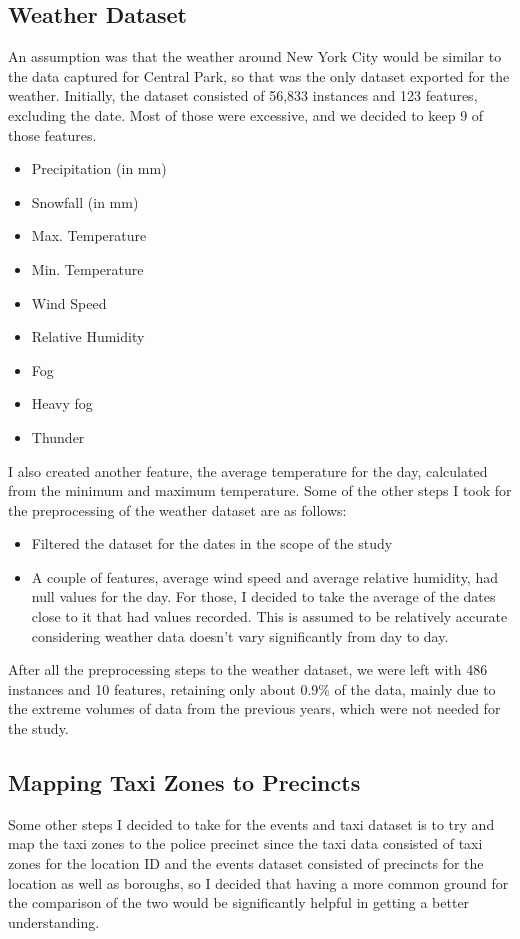 \documentclass[11pt]{article}
\begin{document}
\subsection{Weather Dataset}
\label{subsec:weather}
An assumption was that the weather around New York City would be similar to the data captured for Central Park, so that was the only dataset exported for the weather. 
Initially, the dataset consisted of 56,833 instances and 123 features, excluding the date. Most of those were excessive, and we decided to keep 9 of those features.
\begin{multicols}{3}
\begin{itemize}
    \item Precipitation (in mm)
    \item Snowfall (in mm)
    \item Max. Temperature
    \item Min. Temperature
    \item Wind Speed
    \item Relative Humidity
    \item Fog
    \item Heavy fog
    \item Thunder
\end{itemize}
\end{multicols}
I also created another feature, the average temperature for the day, calculated from the minimum and maximum temperature. 
Some of the other steps I took for the preprocessing of the weather dataset are as follows:

\begin{itemize}
    \item Filtered the dataset for the dates in the scope of the study
    \item A couple of features, average wind speed and average relative humidity, had null values for the day. For those, I decided to take the average of the dates close to it that had values recorded. This is assumed to be relatively accurate considering weather data doesn’t vary significantly from day to day.
\end{itemize}
After all the preprocessing steps to the weather dataset, we were left with 486 instances and 10 features, retaining only about 0.9\% of the data, mainly due to the extreme volumes of data from the previous years, which were not needed for the study.

\subsection{Mapping Taxi Zones to Precincts}
Some other steps I decided to take for the events and taxi dataset is to try and map the taxi zones to the police precinct since the taxi data consisted of taxi zones for the location ID and the events dataset consisted of precincts for the location as well as boroughs, so I decided that having a more common ground for the comparison of the two would be significantly helpful in getting a better understanding.
\end{document}
